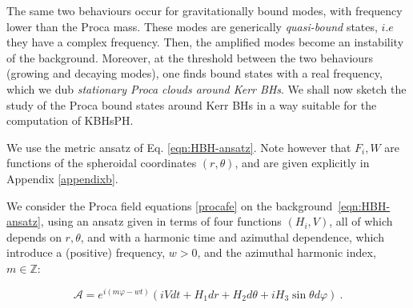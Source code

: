 The same two behaviours occur for gravitationally bound modes, with frequency lower than the Proca mass. These modes are generically \textit{quasi-bound} states, $i.e$ they have a complex frequency. Then, the amplified modes become an instability of the background. Moreover, at the threshold between the two behaviours (growing and decaying modes), one finds bound states with a real frequency, which we dub \textit{stationary Proca clouds around Kerr BHs}. We shall now sketch the study of the Proca bound states around Kerr BHs in a way suitable for the computation of KBHsPH. 

We use the metric ansatz of Eq. \eqref{eqn:HBH-ansatz}.
Note however that $F_i,W$ are functions of the spheroidal coordinates $(r,\theta)$,  and are given explicitly in Appendix \ref{appendixb}.

We consider the Proca field equations \eqref{procafe} on the background~\eqref{eqn:HBH-ansatz}, using an ansatz given in terms of four functions $(H_i,V)$, all of which depends on $r,\theta$, and with a harmonic time and azimuthal dependence, which introduce a (positive) frequency, $w>0$, and the azimuthal harmonic index, $m\in \mathbb{Z}$:

\begin{equation}
\mathcal{A}=e^{i(m\varphi-w t)}\left(
 iV dt  +H_1dr+H_2d\theta+i H_3 \sin \theta d\varphi 
\right) \ .
\label{procaclouds}
\end{equation}

